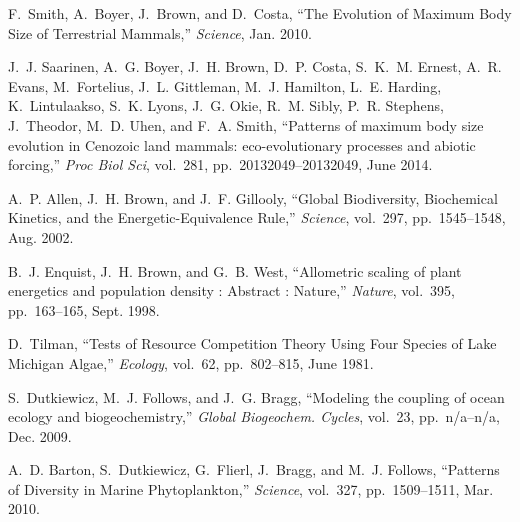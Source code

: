 \documentclass[11pt]{article}
\begin{document}
\begin{multicols}{2}
{\begin{thebibliography}{10}
F.~Smith, A.~Boyer, J.~Brown, and D.~Costa, ``{The Evolution of Maximum Body
  Size of Terrestrial Mammals},'' {\em Science}, Jan. 2010.

J.~J. Saarinen, A.~G. Boyer, J.~H. Brown, D.~P. Costa, S.~K.~M. Ernest, A.~R.
  Evans, M.~Fortelius, J.~L. Gittleman, M.~J. Hamilton, L.~E. Harding,
  K.~Lintulaakso, S.~K. Lyons, J.~G. Okie, R.~M. Sibly, P.~R. Stephens,
  J.~Theodor, M.~D. Uhen, and F.~A. Smith, ``{Patterns of maximum body size
  evolution in Cenozoic land mammals: eco-evolutionary processes and abiotic
  forcing},'' {\em Proc Biol Sci}, vol.~281, pp.~20132049--20132049, June 2014.

A.~P. Allen, J.~H. Brown, and J.~F. Gillooly, ``{Global Biodiversity,
  Biochemical Kinetics, and the Energetic-Equivalence Rule},'' {\em Science},
  vol.~297, pp.~1545--1548, Aug. 2002.

B.~J. Enquist, J.~H. Brown, and G.~B. West, ``{Allometric scaling of plant
  energetics and population density : Abstract : Nature},'' {\em Nature},
  vol.~395, pp.~163--165, Sept. 1998.

D.~Tilman, ``{Tests of Resource Competition Theory Using Four Species of Lake
  Michigan Algae},'' {\em Ecology}, vol.~62, pp.~802--815, June 1981.

S.~Dutkiewicz, M.~J. Follows, and J.~G. Bragg, ``{Modeling the coupling of
  ocean ecology and biogeochemistry},'' {\em Global Biogeochem. Cycles},
  vol.~23, pp.~n/a--n/a, Dec. 2009.

A.~D. Barton, S.~Dutkiewicz, G.~Flierl, J.~Bragg, and M.~J. Follows,
  ``{Patterns of Diversity in Marine Phytoplankton},'' {\em Science}, vol.~327,
  pp.~1509--1511, Mar. 2010.

\end{thebibliography}
}



\end{multicols}



\clearpage
\end{document}
